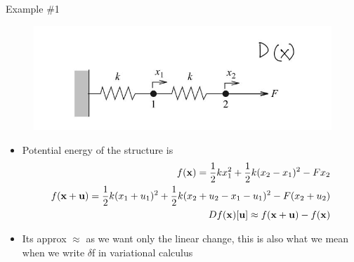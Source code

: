 	\begin{frame}{Example \#1}
		\begin{figure}
			\centering
			\includegraphics[width=0.5\linewidth]{Figure/fig2}
			\label{fig:fig2}
		\end{figure}
		\begin{itemize}
			\item Potential energy of the structure is
			\begin{align*}
				f(\mathbf{x}) = \frac{1}{2}kx_1^2 + \frac{1}{2}k(x_2-x_1)^2 - Fx_2 \\
				f(\mathbf{x+u}) = \frac{1}{2}k(x_1+u_1)^2 + \frac{1}{2}k(x_2 + u_2-x_1-u_1)^2 - F(x_2 + u_2) \\ 
				Df(\mathbf{x})[\mathbf{u}] \approx f(\mathbf{x+u}) - f(\mathbf{x}) 			
			\end{align*}	
			\item  Its approx $\approx$ as we want only the linear change, this is also what we mean when we write $\delta$f in variational calculus		
		\end{itemize}
	\end{frame}

